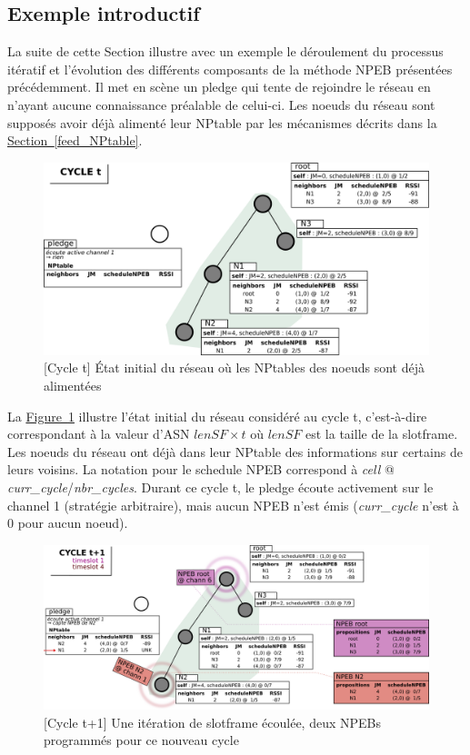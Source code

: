 \documentclass[]{report}
\newcommand{\wordlink}[2]{\hyperref[#2]{#1~\ref{#2}}}
\begin{document}
\newpage

\subsection{Exemple introductif}

La suite de cette Section illustre avec un exemple le déroulement du processus itératif et l'évolution des différents composants de la méthode NPEB présentées précédemment. Il met en scène un pledge qui tente de rejoindre le réseau en n'ayant aucune connaissance préalable de celui-ci. Les noeuds du réseau sont supposés avoir déjà alimenté leur NPtable par les mécanismes décrits dans la \wordlink{Section}{feed_NPtable}.

 \vspace{0.2cm}
	\begin{figure}[!h]
	\centering
	\includegraphics[width=0.85\linewidth]{NPEB_step1}
	\caption{[Cycle t] État initial du réseau où les NPtables des noeuds sont déjà alimentées}
	\label{fig:NPEB_step1}
	\end{figure}
\vspace{0.2cm}

La \wordlink{Figure}{fig:NPEB_step1} illustre l'état initial du réseau considéré au cycle t, c'est-à-dire correspondant à la valeur d'ASN $lenSF \times t$ où $lenSF$ est la taille de la slotframe. Les noeuds du réseau ont déjà dans leur NPtable des informations sur certains de leurs voisins. La notation pour le schedule NPEB correspond à \textit{cell} @ \textit{curr\_cycle}/\textit{nbr\_cycles}. Durant ce cycle t, le pledge écoute activement sur le channel 1 (stratégie arbitraire), mais aucun NPEB n'est émis (\textit{curr\_cycle} n'est à 0 pour aucun noeud).

 \vspace{0.6cm}
	\begin{figure}[!h]
	\centering
	\includegraphics[width=\linewidth]{NPEB_step2}
	\caption{[Cycle t+1] Une itération de slotframe écoulée, deux NPEBs programmés pour ce nouveau cycle}
	\label{fig:NPEB_step2}
	\end{figure}
\vspace{0.2cm}
\end{document}
